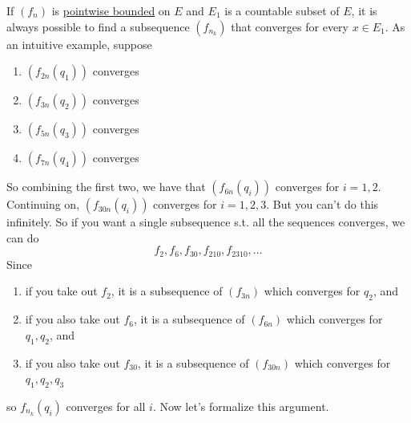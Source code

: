   If $(f_n)$ is \hyperref[def:pointwise-bounded]{pointwise bounded} on $E$ and $E_1$ is a countable subset of $E$, it is always possible to find a subsequence $(f_{n_k})$ that converges for every $x \in E_1$. As an intuitive example, suppose 
  \begin{enumerate}
    \item $(f_{2n} (q_1))$ converges 
    \item $(f_{3n} (q_2))$ converges 
    \item $(f_{5n} (q_3))$ converges 
    \item $(f_{7n} (q_4))$ converges 
  \end{enumerate}
  So combining the first two, we have that $(f_{6n}(q_i))$ converges for $i = 1, 2$. Continuing on, $(f_{30n} (q_i))$ converges for $i = 1, 2, 3$. But you can't do this infinitely. So if you want a single subsequence s.t. all the sequences converges, we can do 
  \begin{equation}
    f_2, f_6, f_{30}, f_{210}, f_{2310}, \ldots
  \end{equation}
  Since 
  \begin{enumerate}
    \item if you take out $f_2$, it is a subsequence of $(f_{3n})$ which converges for $q_2$, and 
    \item if you also take out $f_{6}$, it is a subsequence of $(f_{6n})$ which converges for $q_1, q_2$, and 
    \item if you also take out $f_{30}$, it is a subsequence of $(f_{30n})$ which converges for $q_1, q_2, q_3$
  \end{enumerate}
  so $f_{n_k} (q_i)$ converges for all $i$. Now let's formalize this argument. 

